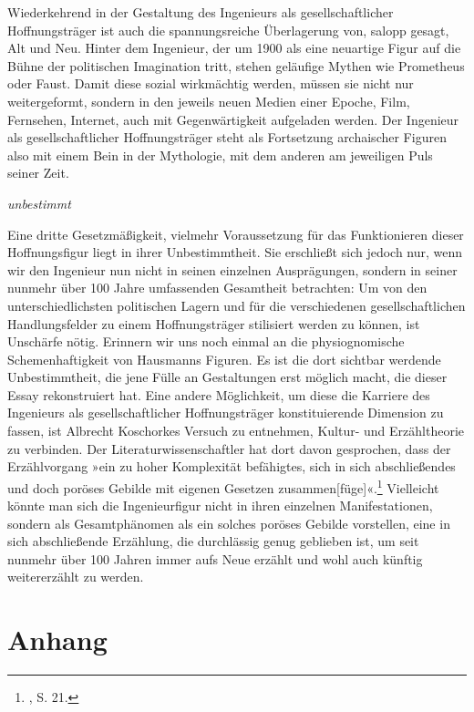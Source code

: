 \documentclass[%
	fontsize=10pt,%
	twoside,%
	headings=optiontoheadandtoc,%
	showtrims]{scrbook}
\renewenvironment{quote}{%
  \addmargin[\genericindent]{0pt}%
  \KOMAoptions{parskip=true}%
  \ifdim\parskip>0pt\else\addvspace{\intextsep}\fi
}{%
  \par
  \endaddmargin\vspace{\intextsep}
}
\begin{document}
\par Wiederkehrend in der Gestaltung des Ingenieurs als gesellschaftlicher Hoffnungsträger ist auch die spannungsreiche Überlagerung von, salopp gesagt, Alt und Neu. Hinter dem Ingenieur, der um 1900 als eine neuartige Figur auf die Bühne der politischen Imagination tritt, stehen geläufige Mythen wie Prometheus oder Faust. Damit diese sozial wirkmächtig werden, müssen sie nicht nur weitergeformt, sondern in den jeweils neuen Medien einer Epoche, Film, Fernsehen, Internet, auch mit Gegenwärtigkeit aufgeladen werden. Der Ingenieur als gesellschaftlicher Hoffnungsträger steht als Fortsetzung archaischer Figuren also mit einem Bein in der Mythologie, mit dem anderen am jeweiligen Puls seiner Zeit.\begin{quote}
\par \emph{unbestimmt}
\end{quote}
\par Eine dritte Gesetzmäßigkeit, vielmehr Voraussetzung für das Funktionieren dieser Hoffnungsfigur liegt in ihrer Unbestimmtheit. Sie erschließt sich jedoch nur, wenn wir den Ingenieur nun nicht in seinen einzelnen Ausprägungen, sondern in seiner nunmehr über 100 Jahre umfassenden Gesamtheit betrachten: Um von den unterschiedlichsten politischen Lagern und für die verschiedenen gesellschaftlichen Handlungsfelder zu einem Hoffnungsträger stilisiert werden zu können, ist Unschärfe nötig. Erinnern wir uns noch einmal an die physiognomische Schemenhaftigkeit von Hausmanns Figuren. Es ist die dort sichtbar werdende Unbestimmtheit, die jene Fülle an Gestaltungen erst möglich macht, die dieser Essay rekonstruiert hat. Eine andere Möglichkeit, um diese die Karriere des Ingenieurs als gesellschaftlicher Hoffnungsträger konstituierende Dimension zu fassen, ist Albrecht Koschorkes Versuch zu entnehmen, Kultur- und Erzähltheorie zu verbinden. Der Literaturwissenschaftler hat dort davon gesprochen, dass der Erzählvorgang »ein zu hoher Komplexität befähigtes, sich in sich abschließendes und doch poröses Gebilde mit eigenen Gesetzen zusammen{[}füge{]}«.\footnote{\cite[][]{koschorke2012a}, S. 21.}  Vielleicht könnte man sich die Ingenieurfigur nicht in ihren einzelnen Manifestationen, sondern als Gesamtphänomen als ein solches poröses Gebilde vorstellen, eine in sich abschließende Erzählung, die durchlässig genug geblieben ist, um seit nunmehr über 100 Jahren immer aufs Neue erzählt und wohl auch künftig weitererzählt zu werden.%
%
						\chapter[head={}, tocentry={ANHANG}]{Anhang}%
					
\end{document}
